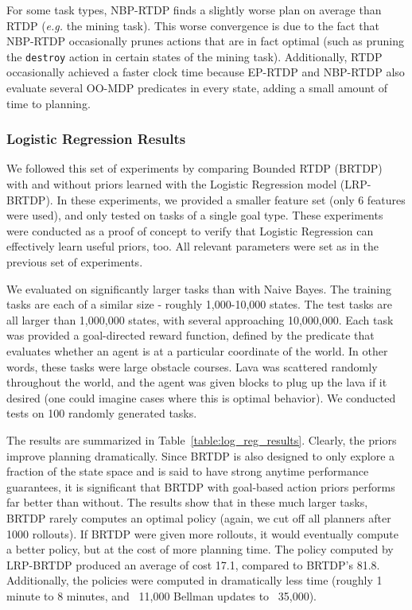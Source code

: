 \documentclass[11pt]{article}
\begin{document}
For some task types, NBP-RTDP finds a slightly worse plan on average than
RTDP ({\em e.g.} the mining task). This worse convergence is due to the fact that NBP-RTDP
occasionally prunes actions that are in fact optimal (such as
pruning the \texttt{destroy} action in certain states of the mining task).
Additionally, RTDP occasionally achieved a faster clock time because EP-RTDP and NBP-RTDP also evaluate several OO-MDP predicates in every state, adding a small amount of time to planning.


\subsubsection{Logistic Regression Results}
We followed this set of experiments by comparing Bounded RTDP (BRTDP) with and without priors learned with the Logistic Regression model (LRP-BRTDP). In these experiments, we provided a smaller feature set (only 6 features were used), and only tested on tasks of a single goal type. These experiments were conducted as a proof of concept to verify that Logistic Regression can effectively learn useful priors, too. All relevant parameters were set as in the previous set of experiments.

We evaluated on significantly larger tasks than with Naive Bayes. The training tasks are each of a similar size - roughly 1,000-10,000 states. The test tasks are all larger than 1,000,000 states, with several approaching 10,000,000. Each task was provided a goal-directed reward function, defined by the predicate that evaluates whether an agent is at a particular coordinate of the world. In other words, these tasks were large obstacle courses. Lava was scattered randomly throughout the world, and the agent was given blocks to plug up the lava if it desired (one could imagine cases where this is optimal behavior). We conducted tests on 100 randomly generated tasks.

The results are summarized in Table~\ref{table:log_reg_results}. Clearly, the priors improve planning dramatically. Since BRTDP is also designed to only explore a fraction of the state space and is said to have strong anytime performance guarantees, it is significant that BRTDP with goal-based action priors performs far better than without. The results show that in these much larger tasks, BRTDP rarely computes an optimal policy (again, we cut off all planners after 1000 rollouts). If BRTDP were given more rollouts, it would eventually compute a better policy, but at the cost of more planning time. The policy computed by LRP-BRTDP produced an average of cost 17.1, compared to BRTDP's  81.8. Additionally, the policies were computed in dramatically less time (roughly 1 minute to 8 minutes, and ~11,000 Bellman updates to ~35,000).
\end{document}
